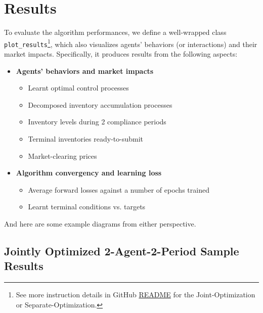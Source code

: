 \documentclass[a4paper,10pt]{article}
\newcommand{\1}{\mathbf{1}}
\begin{document}
\section{Results}\label{results}

To evaluate the algorithm performances, we define a
well-wrapped class \texttt{plot\_results}\footnote{See more instruction details in GitHub \href{https://github.com/OrangeAoo/PA-MFG-FBSDE/blob/3cffc5e8dbe09fbc880f6c2c70d76e0b6a1b8c3c/2Period/Joint_Optim_2Prdx1/README.md}{README} for the Joint-Optimization or Separate-Optimization.}, which also visualizes agents' behaviors (or interactions) and their market impacts. Specifically, it produces results from the following aspects:

\vspace{-0.5\topsep}

\begin{itemize}
  \setlength{\parskip}{0pt}
  \item\textbf{Agents' behaviors and market impacts}
    \begin{itemize}
      \item Learnt optimal control processes
      \item Decomposed inventory accumulation processes
      \item Inventory levels during 2 compliance periods
      \item Terminal inventories ready-to-submit
      \item Market-clearing prices
    \end{itemize}
  \item\textbf{Algorithm convergency and learning loss}
      \begin{itemize}
        \item Average forward losses against a number of epochs trained
        \item Learnt terminal conditions vs. targets
      \end{itemize}
\end{itemize}

And here are some example diagrams from either perspective.

\newpage  %


\subsection{Jointly Optimized 2-Agent-2-Period Sample Results}
\end{document}
